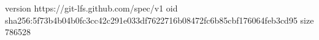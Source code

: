 version https://git-lfs.github.com/spec/v1
oid sha256:5f73b4b04b0fc3cc42c291e033df7622716b08472fc6b85cbf176064feb3cd95
size 786528
